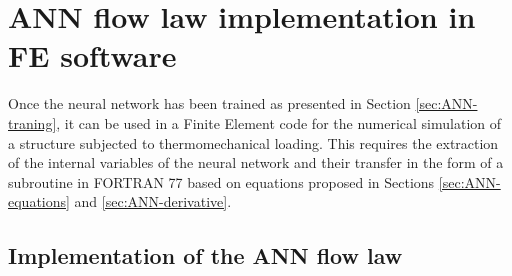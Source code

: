 \documentclass[algorithms,article,submit,pdftex,moreauthors]{Definitions/mdpi}
\begin{document}
\section{ANN flow law implementation in FE software}\label{sec:Use}

Once the neural network has been trained as presented in Section \ref{sec:ANN-traning}, it can be used in a Finite Element code for the numerical simulation of a structure subjected to thermomechanical loading.
This requires the extraction of the internal variables of the neural network and their transfer in the form of a subroutine in FORTRAN 77 based on equations proposed in Sections \ref{sec:ANN-equations} and \ref{sec:ANN-derivative}.

\subsection{Implementation of the ANN flow law}\label{sec:Implementation}
\end{document}
